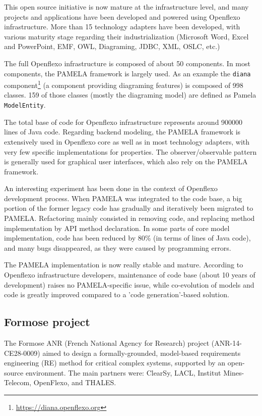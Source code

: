 This open source initiative is now mature at the infrastructure level, and many
projects and applications have been developed and powered using Openflexo
infrastructure. More than 15 technology adapters have been developed, with
various maturity stage regarding their industrialization (Microsoft Word, Excel
and PowerPoint, EMF, OWL, Diagraming, JDBC, XML, OSLC, etc.)

The full Openflexo infrastructure is composed of about 50 components. In most components, the PAMELA framework is largely used. As an example the \texttt{diana} component\footnote{\url{https://diana.openflexo.org}} (a component providing diagraming features) is composed of 998 classes. 159 of those classes (mostly the diagraming model) are defined as Pamela \texttt{ModelEntity}. 

The total base of code for Openflexo infrastructure represents around
\num{900000} lines of Java code. Regarding backend modeling, the PAMELA
framework is extensively used in Openflexo core as well as in most technology
adapters, with very few specific implementations for properties. The
observer/observable pattern is generally used for graphical user interfaces,
which also rely on the PAMELA framework. 

An interesting experiment has been done in the context of Openflexo development process. When PAMELA was integrated to the code base, a big portion of the former legacy code has gradually and iteratively been migrated to PAMELA. Refactoring mainly consisted in removing code, and replacing method implementation by API method declaration. In some parts of core model implementation, code has been reduced by 80\% (in terms of lines of Java code), and many bugs disappeared, as they were caused by programming errors.

The PAMELA implementation is now really stable and mature. According to Openflexo infrastructure developers, maintenance of code base (about 10 years of development) raises no PAMELA-specific issue, while co-evolution of models and code is greatly improved compared to a 'code generation'-based solution.


\subsection{Formose project}

The Formose ANR (French National Agency for Research) project
(ANR-14-CE28-0009)\cite{FormoseWebSite} aimed to design a formally-grounded,
model-based requirements engineering (RE) method for critical complex systems,
supported by an open-source environment. The main partners were: ClearSy, LACL,
Institut Mines-Telecom, OpenFlexo, and THALES. 

